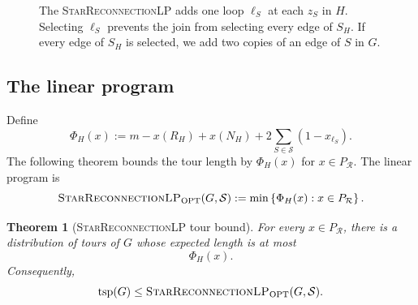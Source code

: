 \documentclass[11pt]{amsart}
\newcommand{\1}{\mathbbm{1}}
\newcommand{\LPtwo}{\textsc{StarReconnectionLP}}
\newtheorem{theorem}{Theorem}[section]
\begin{document}
\begin{figure}[htbp]
\centering
{}
\caption{The \LPtwo{} adds one loop $\ell_S$ at each $z_S$ in $H$.
Selecting $\ell_S$ prevents the join from selecting every edge
of $S_H$. If every edge of $S_H$ is selected, we add two copies
of an edge of $S$ in $G$.}
\label{fig:single-loop}
\end{figure}

\subsection{The linear program}

Define
\[
    \Phi_H(x)
    :=m-x(R_H)+x(N_H)
      +2\sum_{S\in\mathcal S}(1-x_{\ell_S}).
\]
The following theorem bounds the tour length by $\Phi_H(x)$
for $x\in{P_{\mathcal R}}$. The linear program is
\begin{equation}
\label{eq:framework-2-lp}
    \text{\LPtwo}_{\mathrm{OPT}}(G,\mathcal S)
    :=\min\left\{
        \Phi_H(x):x\in{P_{\mathcal R}}
    \right\}.
\end{equation}

\begin{theorem}[\LPtwo{} tour bound]
\label{thm:framework-2-bound}
For every $x\in {P_{\mathcal R}}$, there is a distribution of tours of $G$
whose expected length is at most
\[
    \Phi_H(x).
\]
Consequently,
\[
    \operatorname{tsp}(G)
    \le \text{\LPtwo}_{\mathrm{OPT}}(G,\mathcal S).
\]
\end{theorem}
\end{document}
